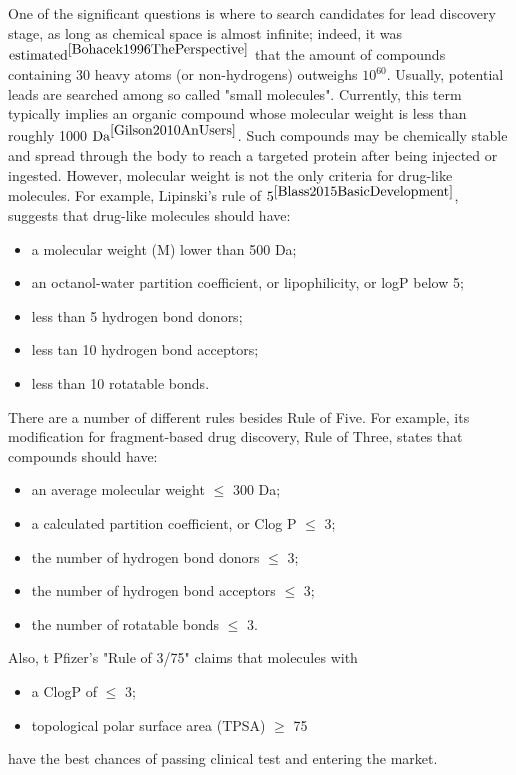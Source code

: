 One of the significant questions is where to search candidates for lead discovery stage, as long as chemical space is almost infinite; indeed, it was $\text{estimated}^{\cite{Bohacek1996ThePerspective}}$ that the amount of compounds containing 30 heavy atoms (or non-hydrogens) outweighs $10^{60}$.
Usually, potential leads are searched among so called "small molecules".
Currently, this term typically implies an organic compound whose molecular weight is less than roughly 1000 $\text{Da}^{\cite{Gilson2010AnUsers}}$.
Such compounds may be chemically stable and spread through the body to reach a targeted protein after being injected or ingested.
However, molecular weight is not the only criteria for drug-like molecules.
For example, Lipinski's rule  of $5^{\cite{Blass2015BasicDevelopment}}$, suggests that drug-like molecules should have:
\begin{itemize}
    \item a molecular weight (M) lower than 500 Da;
    \item an octanol-water partition coefficient, or lipophilicity, or logP below 5;
    \item less than 5 hydrogen bond donors;
    \item less tan 10 hydrogen bond acceptors;
    \item less than 10 rotatable bonds.
\end{itemize}

There are a number of different rules besides Rule of Five. For example, its modification for fragment-based drug discovery, Rule of Three, states that 
compounds should have:
\begin{itemize} 
    \item an average molecular weight $\leq$ 300 Da;
    \item a calculated partition coefficient, or Clog P $\leq$ 3;
    \item the number of hydrogen bond donors $\leq$ 3;
    \item the number of hydrogen bond acceptors $\leq$ 3;
    \item the number of rotatable bonds $\leq$ 3.
\end{itemize}
Also, t Pfizer's "Rule of 3/75" claims that molecules with
\begin{itemize}
    \item a ClogP of $\leq$ 3;
    \item topological polar surface area (TPSA) $\ge$ 75
\end{itemize}
have the best chances of passing clinical test and entering the market.\\

